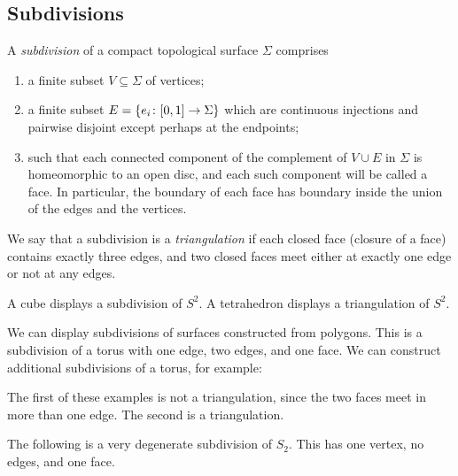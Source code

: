 \subsection{Subdivisions}
\begin{definition}
	A \textit{subdivision} of a compact topological surface \( \Sigma \) comprises
	\begin{enumerate}
		\item a finite subset \( V \subseteq \Sigma \) of vertices;
		\item a finite subset \( E = \qty{e_i \colon [0,1] \to \Sigma} \) which are continuous injections and pairwise disjoint except perhaps at the endpoints;
		\item such that each connected component of the complement of \( V \cup E \) in \( \Sigma \) is homeomorphic to an open disc, and each such component will be called a face.
		      In particular, the boundary of each face has boundary inside the union of the edges and the vertices.
	\end{enumerate}
	We say that a subdivision is a \textit{triangulation} if each closed face (closure of a face) contains exactly three edges, and two closed faces meet either at exactly one edge or not at any edges.
\end{definition}
\begin{example}
	A cube displays a subdivision of \( S^2 \).
	A tetrahedron displays a triangulation of \( S^2 \).
\end{example}
\begin{example}
	We can display subdivisions of surfaces constructed from polygons.
	This is a subdivision of a torus with one edge, two edges, and one face.
	We can construct additional subdivisions of a torus, for example:
	\begin{center}
		 \quad {}
	\end{center}
	The first of these examples is not a triangulation, since the two faces meet in more than one edge.
	The second is a triangulation.
\end{example}
\begin{remark}
	The following is a very degenerate subdivision of \( S_2 \).
	This has one vertex, no edges, and one face.
\end{remark}

